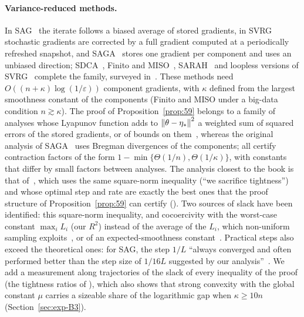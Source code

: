 \paragraph{Variance-reduced methods.}
In SAG~\cite{leroux2012stochastic,schmidt2017minimizing} the iterate follows a biased average of stored gradients,
in SVRG~\cite{johnson2013accelerating} stochastic gradients are corrected by a full gradient computed at a
periodically refreshed snapshot, and SAGA~\cite{defazio2014saga} stores one gradient per component and uses an
unbiased direction;
SDCA~\cite{shalevshwartz2013stochastic}, Finito and MISO~\cite{defazio2014finito,mairal2015incremental},
SARAH~\cite{nguyen2017sarah} and loopless versions of SVRG~\cite{hofmann2015variance,kovalev2020dont} complete the
family, surveyed in~\cite{gower2020variance}. These methods need $O((n+\kappa)\log(1/\varepsilon))$ component
gradients, with $\kappa$ defined from the largest smoothness constant of the components (Finito and MISO under a
big-data condition $n\gtrsim\kappa$). The proof of Proposition~\ref{prop:59} belongs to a family of analyses whose Lyapunov
function adds to $\left\|\theta-\eta_\ast\right\|^2$ a weighted sum of squared errors of the stored gradients, or of bounds
on them~\cite{schmidt2015nonuniform,hofmann2015variance,hu2017unified,gorbunov2020unified,kovalev2020dont},
whereas the original analysis of SAGA~\cite{defazio2014saga} uses Bregman divergences of the components; all certify
contraction factors of the form $1-\min\{\Theta(1/n),\Theta(1/\kappa)\}$, with constants that differ by small factors
between analyses. The analysis closest to the book is that of~\cite{hofmann2015variance}, which uses the same
square-norm inequality (``we sacrifice tightness'') and whose optimal step and rate are exactly the best ones that
the proof structure of Proposition~\ref{prop:59} can certify (). Two sources of slack have
been identified: this square-norm inequality, and cocoercivity
with the worst-case constant $\max_iL_i$ (our $R^2$) instead of the average of the $L_i$, which non-uniform sampling
exploits~\cite{xiao2014proximal,schmidt2015nonuniform,needell2016stochastic}, or of an expected-smoothness
constant~\cite{gower2019sgd,gower2021stochastic}. Practical steps also exceed the theoretical ones: for SAG, the step
$1/L$ ``always converged and often performed better than the step size of $1/16L$ suggested by our
analysis''~\cite{schmidt2017minimizing}. We add a measurement along trajectories of the slack of every inequality of
the proof (the tightness ratios of ), which also shows that strong convexity with the global
constant $\mu$ carries a sizeable share of the logarithmic gap when $\kappa\ge10n$ (Section~\ref{sec:exp-B3}).

